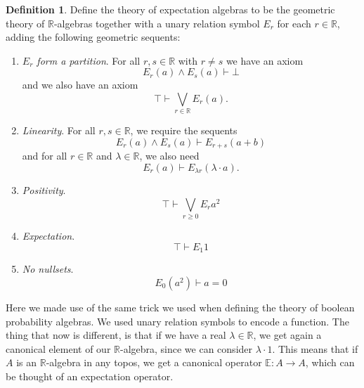 \documentclass[a4paper]{amsproc}
\theoremstyle{plain}
\theoremstyle{definition}
\newtheorem{definition}[theorem]{Definition}
\theoremstyle{remark}
\numberwithin{equation}{section}
\begin{document}
\begin{definition}
    Define the theory of expectation algebras to be the geometric theory of $\mathbb{R}$-algebras together with a unary relation symbol $E_r$ for each $r \in \mathbb{R}$, adding the following geometric sequents:
    \begin{enumerate}
        \item \textit{$E_r$ form a partition}. For all $r, s \in \mathbb{R}$ with $r \neq s$ we have an axiom
        \[
        E_r(a)  \wedge E_s(a) \vdash \bot
        \]
        and we also have an axiom
        \[
        \top \vdash \bigvee_{r \in \mathbb{R}} E_r(a).
        \]
        \item \textit{Linearity}. For all $r, s \in \mathbb{R}$, we require the sequents
        \[
        E_r(a) \wedge E_s(a) \vdash E_{r+s}(a + b)
        \]
        and for all $r \in \mathbb{R}$ and $\lambda \in \mathbb{R}$, we also need
        \[
        E_r(a) \vdash E_{\lambda r} (\lambda \cdot a) .
        \]
        \item \textit{Positivity}.
        \[
            \top \vdash \bigvee_{r \geq 0} E_r a^2
        \]
        \item \textit{Expectation}.
        \[
            \top \vdash E_1 1
        \]
        \item \textit{No nullsets}.
        \[
            E_0 (a^2) \vdash a = 0 %
        \]
    \end{enumerate}
\end{definition}

Here we made use of the same trick we used when defining the theory of boolean probability algebras. We used unary relation symbols to encode a function. The thing that now is different, is that if we have a real $\lambda \in \mathbb{R}$, we get again a canonical element of our $\mathbb{R}$-algebra, since we can consider $\lambda \cdot 1$. This means that if $A$ is an $\mathbb{R}$-algebra in any topos, we get a canonical operator $\mathbb{E}: A \to A$, which can be thought of an expectation operator.
\end{document}
